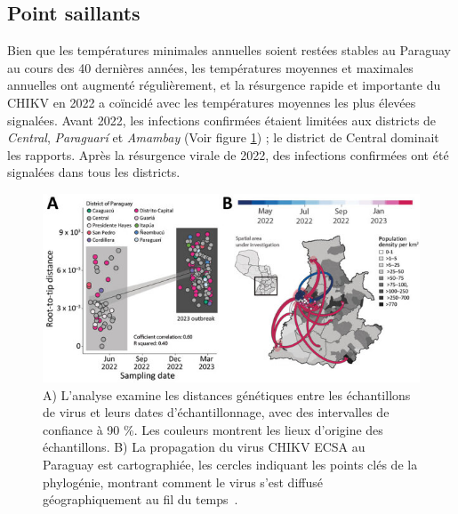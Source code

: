 \subsection{Point saillants}
Bien que les températures minimales annuelles soient restées stables au Paraguay au cours des 40 dernières années, les températures moyennes et maximales annuelles ont augmenté régulièrement, et la résurgence rapide et importante du CHIKV en 2022 a coïncidé avec les températures moyennes les plus élevées signalées. Avant 2022, les infections confirmées étaient limitées aux districts de \textit{Central}, \textit{Paraguarí} et \textit{Amambay} (Voir figure \ref{fig:paraguayregioncases}) ; le district de Central dominait les rapports. Après la résurgence virale de 2022, des infections confirmées ont été signalées dans tous les districts.
\begin{figure}[h!]
	\centering
	\includegraphics[width=0.8\linewidth]{images/paraguay_region_cases}
	\caption[Expansion de l'épidémie de chikungunya de la lignée Est/Centrale/Sud/Africaine au Paraguay~\cite{rapid_expansion_chikungunya_paraguay}]{A) L'analyse examine les distances génétiques entre les échantillons de virus et leurs dates d'échantillonnage, avec des intervalles de confiance à 90 \%. Les couleurs montrent les lieux d'origine des échantillons. B) La propagation du virus CHIKV ECSA au Paraguay est cartographiée, les cercles indiquant les points clés de la phylogénie, montrant comment le virus s'est diffusé géographiquement au fil du temps~\cite{rapid_expansion_chikungunya_paraguay}.}
	\label{fig:paraguayregioncases}
\end{figure}
